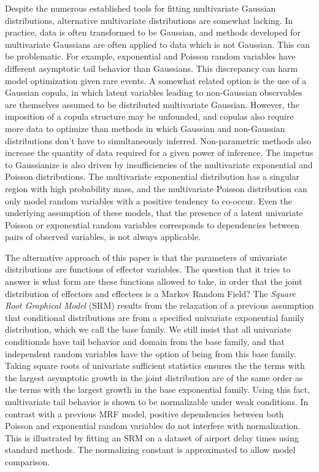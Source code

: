 \documentclass{samkoelleprelimworking}
\begin{document}
Despite the numerous established tools for fitting multivariate Gaussian distributions, alternative multivariate distributions are somewhat lacking.  In practice, data is often transformed to be Gaussian, and methods developed for multivariate Gaussians are often applied to data which is not Gaussian.  This can be problematic.  For example, exponential and Poisson random variables have different asymptotic tail behavior than Gaussians.  This discrepancy can harm model optimization given rare events.  A somewhat related option is the use of a Gaussian copula, in which latent variables leading to non-Gaussian observables are themselves assumed to be distributed multivariate Gaussian.  However, the imposition of a copula structure may be unfounded, and copulas also require more data to optimize than methods in which Gaussian and non-Gaussian distributions don't have to simultaneously inferred.  Non-parametric methods also increase the quantity of data required for a given power of inference.  The impetus to Gaussianize is also driven by insufficiencies of the multivariate exponential and Poisson distributions.   The multivariate exponential distribution has a singular region with high probability mass, and the multivariate Poisson distribution can only model random variables with a positive tendency to co-occur.  Even the underlying assumption of these models, that the presence of a latent univariate Poisson or exponential random variables corresponds to dependencies between pairs of observed variables, is not always applicable. 

The alternative approach of this paper is that the parameters of univariate distributions are functions of effector variables.  The question that it tries to answer is what form are these functions allowed to take, in order that the joint distribution of effectors and effectees is a Markov Random Field?  The \textit{Square Root Graphical Model} (SRM) results from the relaxation of a previous assumption that conditional distributions are from a specified univariate exponential family distribution, which we call the base family.  We still insist that all univariate conditionals have tail behavior and domain from the base family, and that independent random variables have the option of being from this base family.  Taking square roots of univariate sufficient statistics ensures the the terms with the largest asymptotic growth in the joint distribution are of the same order as the terms with the largest growth in the base exponential family.  Using this fact, multivariate tail behavior is shown to be normalizable under weak conditions.  In contrast with a previous MRF model, positive dependencies between both Poisson and exponential random variables do not interfere with normalization. This is illustrated by fitting an SRM on a dataset of airport delay times using standard methods.  The normalizing constant is approximated to allow model comparison.
\end{document}

